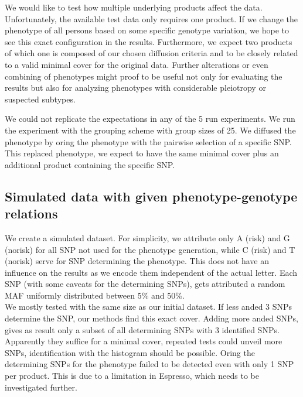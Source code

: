 \documentclass[letterpaper, 11pt]{article}
\begin{document}
We would like to test how multiple underlying products affect the data. Unfortunately, the available test data only requires one product. If we change the phenotype of all persons based on some specific genotype variation, we hope to see this exact configuration in the results. Furthermore, we expect two products of which one is composed of our chosen diffusion criteria and to be closely related to a valid minimal cover for the original data. Further alterations or even combining of phenotypes might proof to be useful not only for evaluating the results but also for analyzing phenotypes with considerable pleiotropy or suspected subtypes.

We could not replicate the expectations in any of the 5 run experiments. We run the experiment with the grouping scheme with group sizes of 25. We diffused the phenotype by oring the phenotype with the pairwise selection of a specific SNP. This replaced phenotype, we expect to have the same minimal cover plus an additional product containing the specific SNP.  
\subsection{Simulated data with given phenotype-genotype relations}

We create a simulated dataset. For simplicity, we attribute only A (risk) and G (norisk) for all SNP not used for the phenotype generation, while C (risk) and T (norisk) serve for SNP determining the phenotype. This does not have an influence on the results as we encode them independent of the actual letter. Each SNP (with some caveats for  the determining SNPs), gets attributed a random MAF uniformly distributed between 5\% and 50\%. \\

We mostly tested with the same size as our initial dataset. If less anded 3 SNPs determine the SNP, our methods find this exact cover. Adding more anded SNPs, gives as result only a subset of all determining SNPs with 3 identified SNPs. Apparently they suffice for a minimal cover, repeated tests could unveil more SNPs, identification with the histogram should be possible. 
Oring the determining SNPs for the phenotype failed to be detected even with only 1 SNP per product. This is due to a limitation in Espresso, which needs to be investigated further. 
\end{document}
